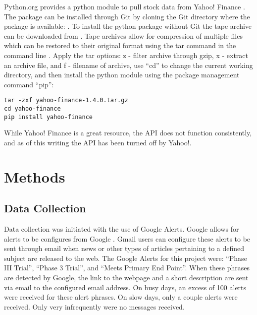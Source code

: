 \documentclass[sigconf]{acmart}
\begin{document}
Python.org provides a python module to pull stock data from Yahoo! Finance \cite{www-python-yahoo}. The package can be installed through Git by cloning the Git directory where the package is available: \cite{www-yahooStock}. To install the python package without Git the tape archive can be downloaded from \cite{www-pythonYahooStock}.  Tape archives allow for compression of multiple files which can be restored to their original format using the tar command in the command line \cite{www-tar}.  Apply the tar options: z - filter archive through gzip, x - extract an archive file, and f - filename of archive, use ``cd'' to change the current working directory, and then install the python module using the package management command ``pip'':
\begin{mdframed}[style=default]
\begin{lstlisting}
tar -zxf yahoo-finance-1.4.0.tar.gz
cd yahoo-finance
pip install yahoo-finance
\end{lstlisting}
\end{mdframed}
While Yahoo! Finance is a great resource, the API does not function consistently, and as of this writing the API has been turned off by Yahoo!.


\section{Methods}
\subsection{Data Collection}
Data collection was initiated with the use of Google Alerts. Google allows for alerts to be configures from Google \cite{www-googleAlerts}. Gmail users can configure these alerts to be sent through email when news or other types of articles pertaining to a defined subject are released to the web. The Google Alerts for this project were: ``Phase III Trial'', ``Phase 3 Trial'', and ``Meets Primary End Point''. When these phrases are detected by Google, the link to the webpage and a short description are sent via email to the configured email address. On busy days, an excess of 100 alerts were received for these alert phrases. On slow days, only a couple alerts were received.  Only very infrequently were no messages received. 
\end{document}

